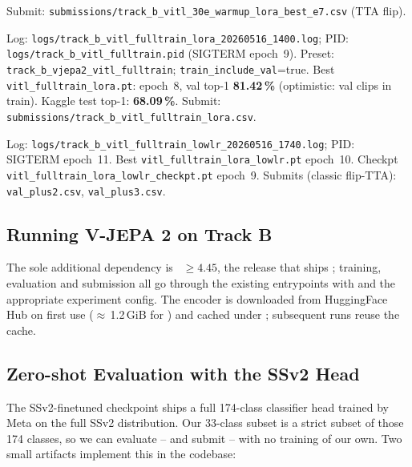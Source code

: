 \begin{table}[ht]
\begin{minipage}{\linewidth}
\begin{description}[leftmargin=1.5em, style=nextline]
  Submit: \texttt{submissions/track\_b\_vitl\_30e\_warmup\_lora\_best\_e7.csv} (TTA flip).
\item[\textbf{Run 5} (STOPPED)]
  Log: \texttt{logs/track\_b\_vitl\_fulltrain\_lora\_20260516\_1400.log};
  PID: \texttt{logs/track\_b\_vitl\_fulltrain.pid} (SIGTERM epoch~9).
  Preset: \texttt{track\_b\_vjepa2\_vitl\_fulltrain}; \texttt{train\_include\_val}=true.
  Best \texttt{vitl\_fulltrain\_lora.pt}: epoch~8, val top-1 \textbf{81.42\,\%}
  (optimistic: val clips in train). Kaggle test top-1: \textbf{68.09\,\%}.
  Submit: \texttt{submissions/track\_b\_vitl\_fulltrain\_lora.csv}.
\item[\textbf{Run 6} (STOPPED)]
  Log: \texttt{logs/track\_b\_vitl\_fulltrain\_lowlr\_20260516\_1740.log};
  PID: SIGTERM epoch~11. Best \texttt{vitl\_fulltrain\_lora\_lowlr.pt} epoch~10.
  Checkpt \texttt{vitl\_fulltrain\_lora\_lowlr\_checkpt.pt} epoch~9.
  Submits (classic flip-TTA): \texttt{val\_plus2.csv}, \texttt{val\_plus3.csv}.
\end{description}
\end{minipage}
\end{table}

\subsection{Running V-JEPA 2 on Track B}

The sole additional dependency is ~$\geq 4.45$, the
release that ships ; training, evaluation and
submission all go through the existing 
entrypoints with  and the appropriate experiment config.
The encoder is downloaded from HuggingFace Hub on first use
($\approx$\,1.2\,GiB for ) and cached under
; subsequent runs reuse the cache.


\subsection{Zero-shot Evaluation with the SSv2 Head}
\label{sec:trackb:zero_shot}

The SSv2-finetuned checkpoint
 ships a full 174-class
classifier head trained by Meta on the full SSv2 distribution. Our
33-class subset is a strict subset of those 174 classes, so we can
evaluate -- and submit -- with no training of our own. Two small
artifacts implement this in the codebase:

